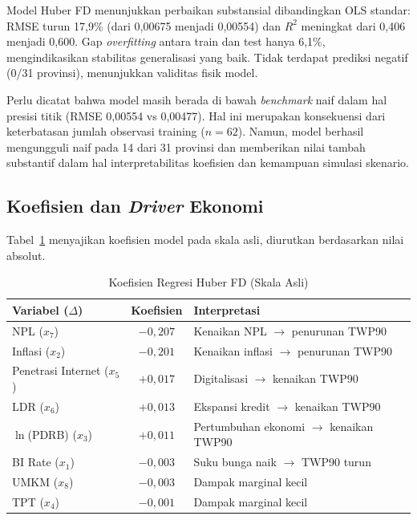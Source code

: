 \documentclass[12pt,a4paper]{article}
\begin{document}
Model Huber FD menunjukkan perbaikan substansial dibandingkan OLS standar: RMSE turun 17,9\% (dari 0,00675 menjadi 0,00554) dan $R^2$ meningkat dari 0,406 menjadi 0,600. Gap \textit{overfitting} antara train dan test hanya 6,1\%, mengindikasikan stabilitas generalisasi yang baik. Tidak terdapat prediksi negatif (0/31 provinsi), menunjukkan validitas fisik model.

Perlu dicatat bahwa model masih berada di bawah \textit{benchmark} naif dalam hal presisi titik (RMSE 0,00554 vs 0,00477). Hal ini merupakan konsekuensi dari keterbatasan jumlah observasi training ($n = 62$). Namun, model berhasil mengungguli naif pada 14 dari 31 provinsi dan memberikan nilai tambah substantif dalam hal interpretabilitas koefisien dan kemampuan simulasi skenario.

\subsection{Koefisien dan \textit{Driver} Ekonomi}

Tabel~\ref{tab:coef} menyajikan koefisien model pada skala asli, diurutkan berdasarkan nilai absolut.

\begin{table}[H]
\centering
\caption{Koefisien Regresi Huber FD (Skala Asli)}
\label{tab:coef}
\begin{tabular}{lcl}
\toprule
\textbf{Variabel ($\Delta$)} & \textbf{Koefisien} & \textbf{Interpretasi} \\
\midrule
NPL ($x_7$) & $-0{,}207$ & Kenaikan NPL $\rightarrow$ penurunan TWP90 \\
Inflasi ($x_2$) & $-0{,}201$ & Kenaikan inflasi $\rightarrow$ penurunan TWP90 \\
Penetrasi Internet ($x_5$) & $+0{,}017$ & Digitalisasi $\rightarrow$ kenaikan TWP90 \\
LDR ($x_6$) & $+0{,}013$ & Ekspansi kredit $\rightarrow$ kenaikan TWP90 \\
$\ln$(PDRB) ($x_3$) & $+0{,}011$ & Pertumbuhan ekonomi $\rightarrow$ kenaikan TWP90 \\
BI Rate ($x_1$) & $-0{,}003$ & Suku bunga naik $\rightarrow$ TWP90 turun \\
UMKM ($x_8$) & $-0{,}003$ & Dampak marginal kecil \\
TPT ($x_4$) & $-0{,}001$ & Dampak marginal kecil \\
\bottomrule
\end{tabular}
\end{table}
\end{document}
